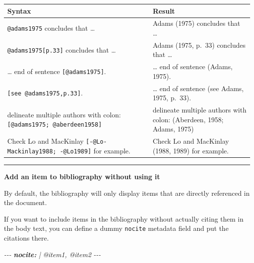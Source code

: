 \documentclass[
  a4paper,
  twoside,
  openright]{book}
\newenvironment{Shaded}{\begin{snugshade}}{\end{snugshade}}
\newcommand{\AnnotationTok}[1]{\textcolor[rgb]{0.56,0.35,0.01}{\textbf{\textit{#1}}}}
\newcommand{\CommentTok}[1]{\textcolor[rgb]{0.56,0.35,0.01}{\textit{#1}}}
\theoremstyle{definition}
\theoremstyle{definition}
\theoremstyle{definition}
\theoremstyle{definition}
\theoremstyle{remark}
\begin{document}
\begin{longtable}[]{@{}
  >{\raggedright\arraybackslash}p{}
  >{\raggedright\arraybackslash}p{}@{}}
\toprule\noalign{}
\begin{minipage}[b]{\linewidth}\raggedright
Syntax
\end{minipage} & \begin{minipage}[b]{\linewidth}\raggedright
Result
\end{minipage} \\
\midrule\noalign{}
\endhead
\bottomrule\noalign{}
\endlastfoot
\texttt{@adams1975} concludes that \ldots{} & Adams (1975) concludes that \ldots{} \\
\texttt{@adams1975{[}p.33{]}} concludes that \ldots{} & Adams (1975, p.~33) concludes that \ldots{} \\
\ldots{} end of sentence \texttt{{[}@adams1975{]}}. & \ldots{} end of sentence (Adams, 1975). \\
\texttt{{[}see\ @adams1975,p.33{]}}. & \ldots{} end of sentence (see Adams, 1975, p.~33). \\
delineate multiple authors with colon: \texttt{{[}@adams1975;\ @aberdeen1958{]}} & delineate multiple authors with colon: (Aberdeen, 1958; Adams, 1975) \\
Check Lo and MacKinlay \texttt{{[}-@Lo-Mackinlay1988;\ -@Lo1989{]}} for example. & Check Lo and MacKinlay (1988, 1989) for example. \\
\end{longtable}

\begin{center}\rule{0.5\linewidth}{0.5pt}\end{center}

\textbf{Add an item to bibliography without using it}

By default, the bibliography will only display items that are directly referenced in the document.

If you want to include items in the bibliography without actually citing them in the body text, you can define a dummy \texttt{nocite} metadata field and put the citations there.

\begin{Shaded}
\begin{Highlighting}[]
\CommentTok{{-}{-}{-}}
\AnnotationTok{nocite:}\CommentTok{ |}
\CommentTok{  @item1, @item2}
\CommentTok{{-}{-}{-}}
\end{Highlighting}
\end{Shaded}
\end{document}
